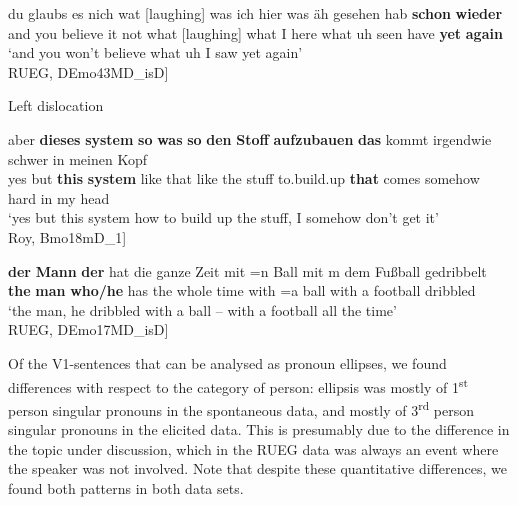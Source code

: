 \documentclass[output=paper,colorlinks,citecolor=brown]{langscibook}
\begin{document}
\ex\label{ex:ch1:ex22}

 {du} {glaubs} {es} {nich} {wat} [{laughing}] {was} {ich} {hier} {was} {äh} {gesehen}  {hab} \textbf{{schon}} \textbf{{wieder}} \\
and you believe it not what {[}laughing{]} what I here what uh seen have \textbf{yet} \textbf{again} \\
\trans ‘and you won’t believe what uh I saw yet again’ \\ \hspace{\fill}{[}RUEG, DEmo43MD\_isD{]}

\z

\ex Left dislocation\label{ex:ch1:left}

\ea\label{ex:ch1:ex23}

 {aber} \textbf{{dieses}} \textbf{{system}} \textbf{{so}} \textbf{{was}} \textbf{{so}} \textbf{{den}} \textbf{{Stoff}} \textbf{{aufzubauen}} \textbf{{das}} {kommt} {irgendwie} {schwer} {in} {meinen} {Kopf}\\
yes but \textbf{this} \textbf{system} like that like the stuff to.build.up \textbf{that} comes somehow hard in my head\\
\trans ‘yes but this system how to build up the stuff, I somehow don’t get it’ \\ \hspace{\fill}{[}Roy, Bmo18mD\_1{]}

\ex\label{ex:ch1:ex24}

\gll \textbf{{der}} \textbf{{Mann}} \textbf{{der}} {hat} {die} {ganze} {Zeit} {mit} {=n} {Ball} {mit} {m dem} {Fußball} {gedribbelt} \\
\textbf{the} \textbf{man} \textbf{who/he} has the whole time with =a ball with a football dribbled \\
\trans ‘the man, he dribbled with a ball – with a football all the time’ \\ \hspace{\fill}{[}RUEG, DEmo17MD\_isD{]}

\z
\z

Of the V1-sentences that can be analysed as pronoun ellipses, we found differences with respect to the category of person: ellipsis was mostly of 1\textsuperscript{st} person singular pronouns in the spontaneous data, and mostly of 3\textsuperscript{rd} person singular pronouns in the elicited data. This is presumably due to the difference in the topic under discussion, which in the RUEG data was always an event where the speaker was not involved. Note that despite these quantitative differences, we found both patterns in both data sets.
\end{document}
